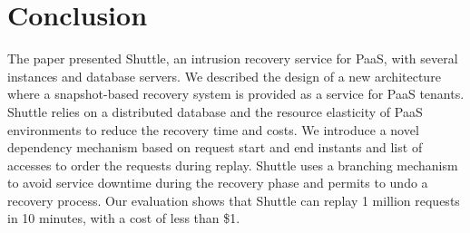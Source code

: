 \documentclass[10pt,conference]{IEEEtran}
\begin{document}
\section{Conclusion}
\label{sec:conclusion}
The paper presented Shuttle, an intrusion recovery service for PaaS, with several instances and database servers. We described the design of a new architecture where a snapshot-based recovery system is provided as a service for PaaS tenants. Shuttle relies on a distributed database and the resource elasticity of PaaS environments to reduce the recovery time and costs. We introduce a novel dependency mechanism based on request start and end instants and list of accesses to order the requests during replay. 
Shuttle uses a branching mechanism to avoid service downtime during the recovery phase and permits to undo a recovery process.  
Our evaluation shows that Shuttle can replay 1 million requests in 10 minutes, with a cost of less than \$1. 







{\footnotesize

}
\end{document}
